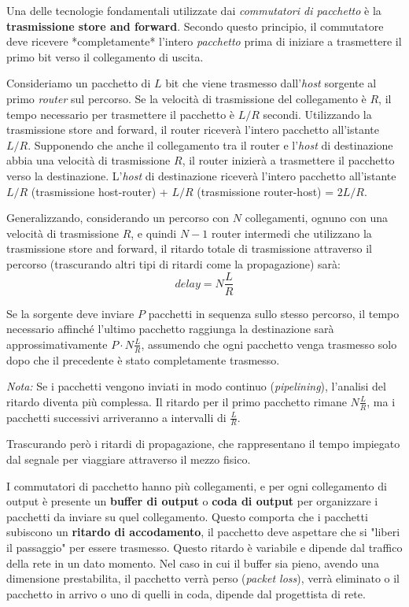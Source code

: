 Una delle tecnologie fondamentali utilizzate dai \textit{commutatori di pacchetto} è la \textbf{trasmissione store and forward}. Secondo questo principio, il commutatore deve ricevere *completamente* l'intero \textit{pacchetto} prima di iniziare a trasmettere il primo bit verso il collegamento di uscita.

Consideriamo un pacchetto di $L$ bit che viene trasmesso dall'\textit{host} sorgente al primo \textit{router} sul percorso. Se la velocità di trasmissione del collegamento è $R$, il tempo necessario per trasmettere il pacchetto è $L/R$ secondi. Utilizzando la trasmissione store and forward, il router riceverà l'intero pacchetto all'istante $L/R$. Supponendo che anche il collegamento tra il router e l'\textit{host} di destinazione abbia una velocità di trasmissione $R$, il router inizierà a trasmettere il pacchetto verso la destinazione. L'\textit{host} di destinazione riceverà l'intero pacchetto all'istante $L/R$ (trasmissione host-router) + $L/R$ (trasmissione router-host) = $2L/R$.

Generalizzando, considerando un percorso con $N$ collegamenti, ognuno con una velocità di trasmissione $R$, e quindi $N-1$ router intermedi che utilizzano la trasmissione store and forward, il ritardo totale di trasmissione attraverso il percorso (trascurando altri tipi di ritardi come la propagazione) sarà:
\[
  delay = N \frac{L}{R}
\]

Se la sorgente deve inviare $P$ pacchetti in sequenza sullo stesso percorso, il tempo necessario affinché l'ultimo pacchetto raggiunga la destinazione sarà approssimativamente $P \cdot N \frac{L}{R}$, assumendo che ogni pacchetto venga trasmesso solo dopo che il precedente è stato completamente trasmesso.

\textit{Nota:} Se i pacchetti vengono inviati in modo continuo (\textit{pipelining}), l'analisi del ritardo diventa più complessa. Il ritardo per il primo pacchetto rimane $N \frac{L}{R}$, ma i pacchetti successivi arriveranno a intervalli di $\frac{L}{R}$.

Trascurando però i ritardi di propagazione, che rappresentano il tempo impiegato dal segnale per viaggiare attraverso il mezzo fisico.

I commutatori di pacchetto hanno più collegamenti, e per ogni collegamento di output è presente un \textbf{buffer di output} o \textbf{coda di output} per organizzare i pacchetti da inviare su quel collegamento. Questo comporta che i pacchetti subiscono un \textbf{ritardo di accodamento}, il pacchetto deve aspettare che si "liberi il passaggio" per essere trasmesso. Questo ritardo è variabile e dipende dal traffico della rete in un dato momento. Nel caso in cui il buffer sia pieno, avendo una dimensione prestabilita, il pacchetto verrà perso (\textit{packet loss}), verrà eliminato o il pacchetto in arrivo o uno di quelli in coda, dipende dal progettista di rete.

